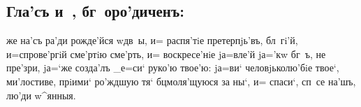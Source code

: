 \documentclass[14pt,twoside]{extreport}
\renewcommand{\*}{~~\raise3pt\hbox{\footnotesize*}}
\begin{document}
\subsection{Гла'съ и~, бг~оро'диченъ:}

же на'съ ра'ди рожде'йся w\т дв~ы, и= распя'тiе претерпjь'въ,
бл~гi'й, и=спрове'ргiй сме'ртiю сме'рть, и= воскресе'нiе jа=вле'й jа='кw бг~ъ,
не пре'зри, jа=`же созда'лъ _е=си` руко'ю твое'ю: jа=ви` человjьколю'бiе
твое`, ми'лостиве, прiими` ро'ждшую тя` бц моля'щуюся за ны`, и= спаси`,
сп~се на'шъ, лю'ди w^янныя.

\csendpict
\clearpage
\thispagestyle{izhcontentspage}
\baselineskip
\tableofcontents
\end{document}
